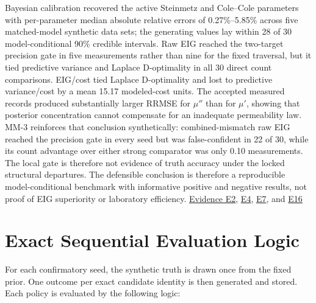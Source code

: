 Bayesian calibration recovered the active Steinmetz and Cole--Cole
parameters with per-parameter median absolute relative errors of
0.27\%--5.85\% across five matched-model synthetic data sets; the
generating values lay within 28 of 30 model-conditional 90\% credible
intervals. Raw EIG reached the two-target precision gate in five
measurements rather than nine for the fixed traversal, but it tied
predictive variance and Laplace D-optimality in all 30 direct count
comparisons. EIG/cost tied Laplace D-optimality and lost to predictive
variance/cost by a mean 15.17 modeled-cost units. The accepted measured
records produced substantially larger RRMSE for \(\mu''\) than for
\(\mu'\), showing that posterior concentration cannot compensate for an
inadequate permeability law. MM-3 reinforces that conclusion
synthetically: combined-mismatch raw EIG reached the precision gate in
every seed but was false-confident in 22 of 30, while its count
advantage over either strong comparator was only 0.10 measurements. The
local gate is therefore not evidence of truth accuracy under the locked
structural departures. The defensible conclusion is therefore a
reproducible model-conditional benchmark with informative positive and
negative results, not proof of EIG superiority or laboratory efficiency.
\href{https://github.com/hoangduong6210/EIG-bayesian-for-Recover-potential-Physical-Parameter-of-MagComponent/blob/a3e6326621d90123e5661c17e2d562fb0f5e0a41/wiki/evidence/Evidence-Sources.md\#e2}{Evidence
E2},
\href{https://github.com/hoangduong6210/EIG-bayesian-for-Recover-potential-Physical-Parameter-of-MagComponent/blob/a3e6326621d90123e5661c17e2d562fb0f5e0a41/wiki/evidence/Evidence-Sources.md\#e4}{E4},
\href{https://github.com/hoangduong6210/EIG-bayesian-for-Recover-potential-Physical-Parameter-of-MagComponent/blob/a3e6326621d90123e5661c17e2d562fb0f5e0a41/wiki/evidence/Evidence-Sources.md\#e7}{E7},
and
\href{https://github.com/hoangduong6210/EIG-bayesian-for-Recover-potential-Physical-Parameter-of-MagComponent/blob/a3e6326621d90123e5661c17e2d562fb0f5e0a41/wiki/evidence/Evidence-Sources.md\#e16}{E16}

\hypertarget{exact-sequential-evaluation-logic}{%
\section{Exact Sequential Evaluation
Logic}\label{exact-sequential-evaluation-logic}}

For each confirmatory seed, the synthetic truth is drawn once from the
fixed prior. One outcome per exact candidate identity is then generated
and stored. Each policy is evaluated by the following logic:

